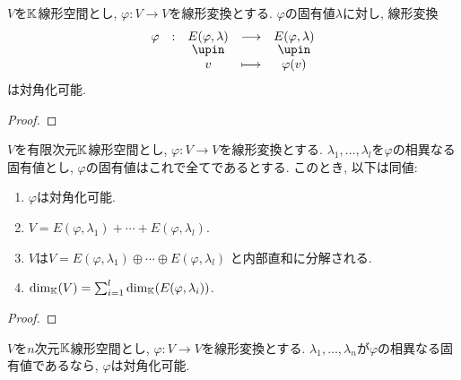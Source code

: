 \begin{lemma}
  $V$を$\mathbb{K}$線形空間とし,
  $\varphi\colon V\to V$を線形変換とする.
  $\varphi$の固有値$\lambda$に対し,
  線形変換
  \begin{align*}
    \shazo{\varphi}{E(\varphi,\lambda)}{E(\varphi,\lambda)}
    {v}{\varphi(v)}
  \end{align*}
  は対角化可能.
\end{lemma}
\begin{proof}\end{proof}
\begin{prop}
  $V$を有限次元$\mathbb{K}$線形空間とし,
  $\varphi\colon V\to V$を線形変換とする.
  $\lambda_1,\ldots,\lambda_l$を$\varphi$の相異なる固有値とし,
  $\varphi$の固有値はこれで全てであるとする.
  このとき, 以下は同値:
  \begin{enumerate}
  \item $\varphi$は対角化可能.
  \item $V=E(\varphi,\lambda_1)+\cdots+ E(\varphi,\lambda_l)$.
  \item $V$は$V=E(\varphi,\lambda_1)\oplus\cdots \oplus E(\varphi,\lambda_l)$
    と内部直和に分解される.
  \item $\dim_{\mathbb{K}}(V)=\sum_{i=1}^{l} \dim_{\mathbb{K}}(E(\varphi,\lambda_i))$.
  \end{enumerate}
\end{prop}
\begin{proof}\end{proof}

\begin{cor}
  $V$を$n$次元$\mathbb{K}$線形空間とし,
  $\varphi\colon V\to V$を線形変換とする.
  $\lambda_1,\ldots,\lambda_n$が$\varphi$の相異なる固有値であるなら,
  $\varphi$は対角化可能.  
\end{cor}

